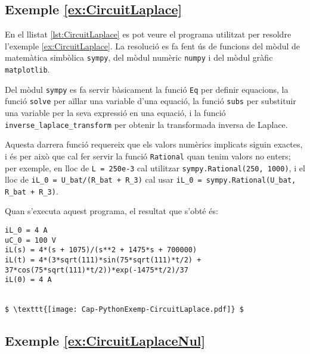 \hypertarget{exemple:CircuitLaplace}{\subsection{Exemple \ref*{ex:CircuitLaplace} \CircuitLaplace}}
En el llistat \vref{lst:CircuitLaplace} es pot veure el programa utilitzat per resoldre l'exemple \vref{ex:CircuitLaplace}. La resolució es fa fent ús de funcions del mòdul de matemàtica simbòlica \texttt{sympy}, del mòdul numèric \texttt{numpy} i del mòdul gràfic  \texttt{matplotlib}. 

Del mòdul \texttt{sympy} es fa servir bàsicament la funció \texttt{Eq} per definir equacions,  la funció \texttt{solve} per aïllar una variable d'una equació, la funció \texttt{subs} per substituir  una variable per la seva expressió en una equació, i la   funció \texttt{inverse\_laplace\_transform} per obtenir la transformada inversa de Laplace. 

Aquesta  darrera funció requereix que els valors numèrics implicats siguin exactes, i és per això que cal fer servir la funció \texttt{Rational} quan tenim valors no enters; per exemple, en lloc de \texttt{L = 250e-3} cal utilitzar \texttt{sympy.Rational(250, 1000)}, i el lloc de \texttt{iL\_0 =  U\_bat/(R\_bat + R\_3)} cal usar \texttt{iL\_0 = sympy.Rational(U\_bat, R\_bat + R\_3)}.
\pagebreak



Quan s'executa aquest programa, el resultat que s'obté és:
\lstset{
	language=,
	numbers=none,
	frame=none
}
\begin{lstlisting}[mathescape=true]
iL_0 = 4 A
uC_0 = 100 V
iL(s) = 4*(s + 1075)/(s**2 + 1475*s + 700000)
iL(t) = 4*(3*sqrt(111)*sin(75*sqrt(111)*t/2) + 37*cos(75*sqrt(111)*t/2))*exp(-1475*t/2)/37
iL(0) = 4 A


$ \texttt{[image: Cap-PythonExemp-CircuitLaplace.pdf]} $
\end{lstlisting} 



\hypertarget{exemple:CircuitLaplaceNul}{\subsection{Exemple \ref*{ex:CircuitLaplaceNul} \CircuitLaplaceNul}}

